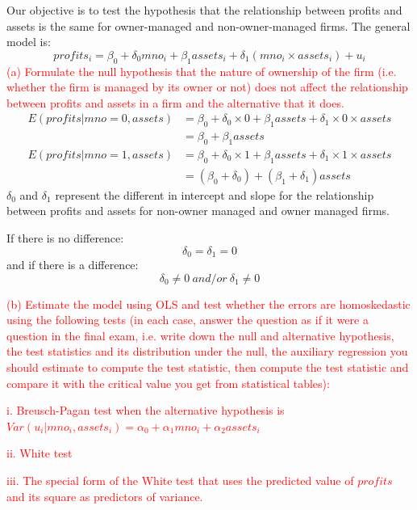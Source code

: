 \documentclass[12pt]{report}
\begin{document}
\vspace{-\baselineskip}
\noindent Our objective is to test the hypothesis that the relationship between profits and assets is the same for owner-managed and non-owner-managed firms. The general model is: $$profits_i = \beta_0 + \delta_0mno_i + \beta_1assets_i + \delta_1 (mno_i \times assets_i) + u_i$$
\noindent \textcolor{red}
{
	(a) Formulate the null hypothesis that the nature of ownership of the firm (i.e. whether the firm is managed by its owner or not) does not affect the relationship between profits and assets in a firm and the alternative that it does.	
}
\begin{align*}
E(profits|mno=0,assets) &= \beta_0 + \delta_0\times 0 + \beta_1assets + \delta_1\times 0\times assets \\
& = \beta_0 + \beta_1assets
\end{align*}
\begin{align*}
E(profits|mno=1,assets) &= \beta_0 + \delta_0\times 1 + \beta_1 assets + \delta_1 \times 1\times assets \\
& = (\beta_0 + \delta_0) + (\beta_1 + \delta_1)assets
\end{align*}
\noindent $\delta_0$ and $\delta_1$ represent the different in intercept and slope for the relationship between profits and assets for non-owner managed and owner managed firms.

\noindent If there is no difference:
$$\delta_0 = \delta_1 = 0$$
\noindent and if there is a difference:
$$\delta_0 \neq 0\ and/or\ \delta_1 \neq 0$$

\newpage
\noindent \textcolor{red}{(b) Estimate the model using OLS and test whether the errors are homoskedastic using the following tests (in each case, answer the question as if it were a question in the final exam, i.e. write down the null and alternative hypothesis, the test statistics and its distribution under the null, the auxiliary regression you should estimate to compute the test statistic, then compute the test statistic and compare it with the critical value you get from statistical tables):}

\noindent \textcolor{red}{i. Breusch-Pagan test when the alternative hypothesis is $Var(u_i|mno_i , assets_i) = \alpha_0 + \alpha_1 mno_i + \alpha_2 assets_i$}

\noindent \textcolor{red}{ii. White test}

\noindent \textcolor{red}{iii. The special form of the White test that uses the predicted value of $profits$ and its square as predictors of variance.}
\end{document}
